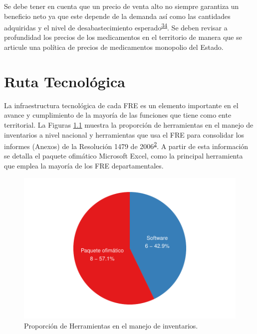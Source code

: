 \documentclass[
]{book}
\begin{document}
Se debe tener en cuenta que un precio de venta alto no siempre garantiza un beneficio neto ya que este depende de la demanda así como las cantidades adquiridas y el nivel de desabastecimiento esperado\textsuperscript{\protect\hyperlink{ref-Silver2017}{34}}. Se deben revisar a profundidad los precios de los medicamentos en el territorio de manera que se articule una política de precios de medicamentos monopolio del Estado.

\hypertarget{ruta-tecnoluxf3gica}{%
\chapter{Ruta Tecnológica}\label{ruta-tecnoluxf3gica}}


La infraestructura tecnológica de cada FRE es un elemento importante en el avance y cumplimiento de la mayoría de las funciones que tiene como ente territorial. La Figuras \ref{fig:PropHerramientasManejoInventarios} muestra la proporción de herramientas en el manejo de inventarios a nivel nacional y herramientas que usa el FRE para consolidar los informes (Anexos) de la Resolución 1479 de 2006\textsuperscript{\protect\hyperlink{ref-MSPS1479-2006}{2}}. A partir de esta información se detalla el paquete ofimático Microsoft Excel, como la principal herramienta que emplea la mayoría de los FRE departamentales.

\begin{figure}

{\centering \includegraphics[width=0.85\linewidth]{InformeFinal_files/figure-latex/PropHerramientasManejoInventarios-1} 

}

\caption{Proporción de Herramientas en el manejo de inventarios.}\label{fig:PropHerramientasManejoInventarios}
\end{figure}
\end{document}
